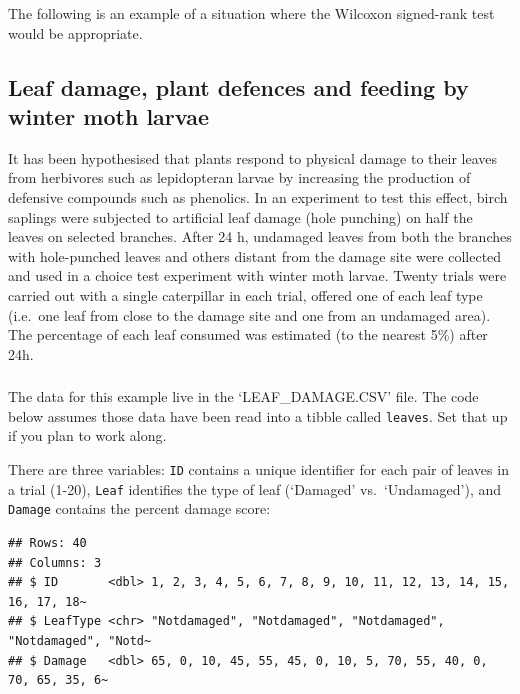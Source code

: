\documentclass[
]{book}
\newenvironment{greybox}{
  \definecolor{shadecolor}{rgb}{0.95,0.95,0.95}  %
  \color{black}
  \begin{shaded}}
 {\end{shaded}}
\newenvironment{infobox}[1]
  {
  \begin{itemize}
  \renewcommand{\labelitemi}{
    \raisebox{-.7\height}[0pt][0pt]{
      {\setkeys{Gin}{width=3em,keepaspectratio}
        \texttt{[image: images/\#1]}}
    }
  }
  \setlength{\fboxsep}{1em}
  \begin{greybox}
  \item
  }
  {
  \end{greybox}
  \end{itemize}
  }
\begin{document}
The following is an example of a situation where the Wilcoxon signed-rank test would be appropriate.

\hypertarget{leaf-damage-plant-defences-and-feeding-by-winter-moth-larvae}{%
\subsection{Leaf damage, plant defences and feeding by winter moth larvae}\label{leaf-damage-plant-defences-and-feeding-by-winter-moth-larvae}}

It has been hypothesised that plants respond to physical damage to their leaves from herbivores such as lepidopteran larvae by increasing the production of defensive compounds such as phenolics. In an experiment to test this effect, birch saplings were subjected to artificial leaf damage (hole punching) on half the leaves on selected branches. After 24 h, undamaged leaves from both the branches with hole-punched leaves and others distant from the damage site were collected and used in a choice test experiment with winter moth larvae. Twenty trials were carried out with a single caterpillar in each trial, offered one of each leaf type (i.e.~one leaf from close to the damage site and one from an undamaged area). The percentage of each leaf consumed was estimated (to the nearest 5\%) after 24h.

\begin{infobox}{action}

\hypertarget{section-19}{%
\subsubsection*{}\label{section-19}}

The data for this example live in the `LEAF\_DAMAGE.CSV' file. The code below assumes those data have been read into a tibble called \texttt{leaves}. Set that up if you plan to work along.

\end{infobox}

There are three variables: \texttt{ID} contains a unique identifier for each pair of leaves in a trial (1-20), \texttt{Leaf} identifies the type of leaf (`Damaged' vs.~`Undamaged'), and \texttt{Damage} contains the percent damage score:

\begin{verbatim}
## Rows: 40
## Columns: 3
## $ ID       <dbl> 1, 2, 3, 4, 5, 6, 7, 8, 9, 10, 11, 12, 13, 14, 15, 16, 17, 18~
## $ LeafType <chr> "Notdamaged", "Notdamaged", "Notdamaged", "Notdamaged", "Notd~
## $ Damage   <dbl> 65, 0, 10, 45, 55, 45, 0, 10, 5, 70, 55, 40, 0, 70, 65, 35, 6~
\end{verbatim}
\end{document}

